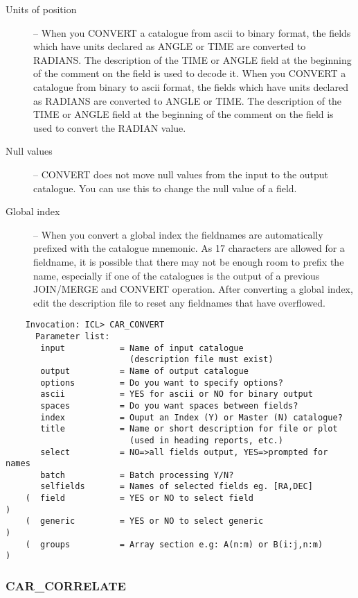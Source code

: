 \begin{description}
\item [Units of position] --
When you CONVERT a catalogue from ascii to binary format, the
fields which have units declared as ANGLE or TIME are converted to RADIANS.
The description of the TIME or ANGLE field at the beginning of the comment on
the field is used to decode it.
When you CONVERT a catalogue from binary to ascii format, the
fields which have units declared as RADIANS are converted to ANGLE or TIME.
The description of the TIME or ANGLE field at the beginning of the comment on
the field is used to convert the RADIAN value.
\item [Null values] --
CONVERT does not move null values from the input to the output catalogue.
You can use this to change the null value of a field.
\item [Global index] --
When you convert a global index the fieldnames are automatically
prefixed with the catalogue mnemonic.
As 17 characters are allowed for a fieldname, it is possible that there may not
be enough room to prefix the name, especially if one of the catalogues is the
output of a previous JOIN/MERGE and CONVERT operation.
After converting a global index, edit the description file to reset any
fieldnames that have overflowed.
\end{description}

\begin{verbatim}
    Invocation: ICL> CAR_CONVERT
      Parameter list:
       input           = Name of input catalogue
                         (description file must exist)
       output          = Name of output catalogue
       options         = Do you want to specify options?
       ascii           = YES for ascii or NO for binary output
       spaces          = Do you want spaces between fields?
       index           = Ouput an Index (Y) or Master (N) catalogue?
       title           = Name or short description for file or plot
                         (used in heading reports, etc.)
       select          = NO=>all fields output, YES=>prompted for names
       batch           = Batch processing Y/N?
       selfields       = Names of selected fields eg. [RA,DEC]
    (  field           = YES or NO to select field                               )
    (  generic         = YES or NO to select generic                             )
    (  groups          = Array section e.g: A(n:m) or B(i:j,n:m)                 )
\end{verbatim}

\subsubsection{CAR\_CORRELATE}

